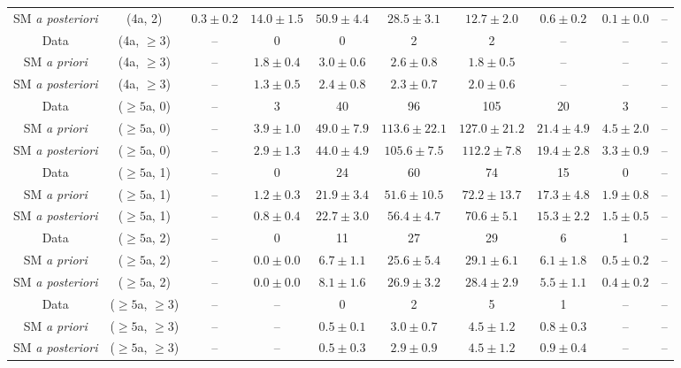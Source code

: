 \begin{table}[h!]
{\begin{tabular}{cccccccccc}
	SM \textit{a posteriori} & (4a, 2) & $0.3\pm 0.2$ & $14.0\pm 1.5$ & $50.9\pm 4.4$ & $28.5\pm 3.1$ & $12.7\pm 2.0$ & $0.6\pm 0.2$ & $0.1\pm 0.0$ & -- \\[0.5ex] 
	Data & (4a, $\ge3$) & -- & 0 & 0 & 2 & 2 & -- & -- & -- \\[0.5ex] 
	SM \textit{a priori} & (4a, $\ge3$) & -- & $1.8\pm 0.4$ & $3.0\pm 0.6$ & $2.6\pm 0.8$ & $1.8\pm 0.5$ & -- & -- & -- \\[0.5ex] 
	SM \textit{a posteriori} & (4a, $\ge3$) & -- & $1.3\pm 0.5$ & $2.4\pm 0.8$ & $2.3\pm 0.7$ & $2.0\pm 0.6$ & -- & -- & -- \\[0.5ex] 
	Data & ($\ge5$a, 0) & -- & 3 & 40 & 96 & 105 & 20 & 3 & -- \\[0.5ex] 
	SM \textit{a priori} & ($\ge5$a, 0) & -- & $3.9\pm 1.0$ & $49.0\pm 7.9$ & $113.6\pm 22.1$ & $127.0\pm 21.2$ & $21.4\pm 4.9$ & $4.5\pm 2.0$ & -- \\[0.5ex] 
	SM \textit{a posteriori} & ($\ge5$a, 0) & -- & $2.9\pm 1.3$ & $44.0\pm 4.9$ & $105.6\pm 7.5$ & $112.2\pm 7.8$ & $19.4\pm 2.8$ & $3.3\pm 0.9$ & -- \\[0.5ex] 
	Data & ($\ge5$a, 1) & -- & 0 & 24 & 60 & 74 & 15 & 0 & -- \\[0.5ex] 
	SM \textit{a priori} & ($\ge5$a, 1) & -- & $1.2\pm 0.3$ & $21.9\pm 3.4$ & $51.6\pm 10.5$ & $72.2\pm 13.7$ & $17.3\pm 4.8$ & $1.9\pm 0.8$ & -- \\[0.5ex] 
	SM \textit{a posteriori} & ($\ge5$a, 1) & -- & $0.8\pm 0.4$ & $22.7\pm 3.0$ & $56.4\pm 4.7$ & $70.6\pm 5.1$ & $15.3\pm 2.2$ & $1.5\pm 0.5$ & -- \\[0.5ex] 
	Data & ($\ge5$a, 2) & -- & 0 & 11 & 27 & 29 & 6 & 1 & -- \\[0.5ex] 
	SM \textit{a priori} & ($\ge5$a, 2) & -- & $0.0\pm 0.0$ & $6.7\pm 1.1$ & $25.6\pm 5.4$ & $29.1\pm 6.1$ & $6.1\pm 1.8$ & $0.5\pm 0.2$ & -- \\[0.5ex] 
	SM \textit{a posteriori} & ($\ge5$a, 2) & -- & $0.0\pm 0.0$ & $8.1\pm 1.6$ & $26.9\pm 3.2$ & $28.4\pm 2.9$ & $5.5\pm 1.1$ & $0.4\pm 0.2$ & -- \\[0.5ex] 
	Data & ($\ge5$a, $\ge3$) & -- & -- & 0 & 2 & 5 & 1 & -- & -- \\[0.5ex] 
	SM \textit{a priori} & ($\ge5$a, $\ge3$) & -- & -- & $0.5\pm 0.1$ & $3.0\pm 0.7$ & $4.5\pm 1.2$ & $0.8\pm 0.3$ & -- & -- \\[0.5ex] 
	SM \textit{a posteriori} & ($\ge5$a, $\ge3$) & -- & -- & $0.5\pm 0.3$ & $2.9\pm 0.9$ & $4.5\pm 1.2$ & $0.9\pm 0.4$ & -- & -- \\[0.5ex] 
	\hline
	\hline
\end{tabular}}
\end{table}
